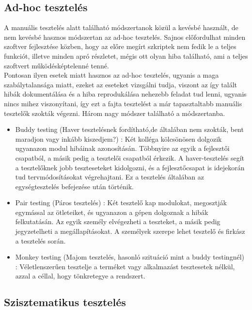 \subsection{Ad-hoc tesztelés} A manuális tesztelés alatt található módszertanok közül a kevésbé használt, de nem kevésbé hasznos módszertan az ad-hoc tesztelés. Sajnos előfordulhat minden szoftver fejlesztése közben, hogy az előre megírt szkriptek nem fedik le a teljes funkciót, illetve minden apró részletet, mégis ott olyan hiba található, ami a teljes szoftvert működésképtelenné tenné.\\ Pontosan ilyen esetek miatt hasznos az ad-hoc tesztelés, ugyanis a maga szabálytalansága miatt, ezeket az eseteket vizsgálni tudja, viszont az így talált hibák dokumentálása és a hiba reprodukálása nehezebb feladat tud lenni, ugyanis nincs mihez viszonyítani, így ezt a fajta tesztelést a már tapasztaltabb manuális tesztelők szokták végezni. Három nagy módszer található a módszertanba.
\begin{itemize}
\item Buddy testing (Haver tesztelésnek fordítható,de általában nem szokták, bent maradjon vagy inkább kiszedjem?) : Két kolléga kölcsönösen dolgozik ugyanazon modul hibáinak azonosításán. Többnyire az egyik a fejlesztői csapatból, a másik pedig a tesztelői csapatból érkezik. A haver-tesztelés segít a tesztelőknek jobb teszteseteket kidolgozni, és a fejlesztőcsapat is idejekorán tud tervmódosításokat végrehajtani. Ez a tesztelés általában az egységtesztelés befejezése után történik.
\item Pair testing (Páros tesztelés) : Két tesztelő kap modulokat, megosztják egymással az ötleteiket, és ugyanazon a gépen dolgoznak a hibák felkutatásán. Az egyik személy elvégezheti a teszteket, a másik pedig jegyzetelheti a megállapításokat. A személyek szerepe lehet tesztelő és firkász a tesztelés során.
\item Monkey testing (Majom tesztelés, hasonló szituáció mint a buddy testingnél) : Véletlenszerűen tesztelje a terméket vagy alkalmazást tesztesetek nélkül, azzal a céllal, hogy tönkretegye a rendszert.
\end{itemize} \cite{guru99}

\subsection{Szisztematikus tesztelés}

